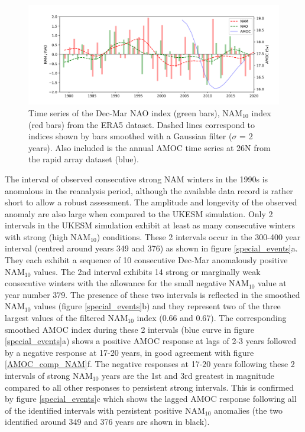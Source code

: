 \begin{figure}[h!]
\begin{center}
\noindent\includegraphics[width = 0.9\linewidth]{Figures/Figures-surface/ERA5_series_allf.png} \caption[Time series of NAO, NAM$_{10}$ and AMOC from the ERA5 and  RAPID]{Time series of the Dec-Mar NAO index (green bars), NAM$_{10}$ index (red bars) from the ERA5 dataset. Dashed lines correspond to indices shown by bars smoothed with a Gaussian filter ($\sigma$ = 2 years). Also included is the annual AMOC time series at 26N from the rapid array dataset (blue).}
\label{ERA5_series}
\end{center}
\end{figure}

The interval of observed consecutive strong NAM winters in the 1990s is anomalous in the reanalysis period, although the available data record is rather short to allow a robust assessment. The amplitude and longevity of the observed anomaly are also large when compared to the UKESM simulation. Only 2 intervals in the UKESM simulation exhibit at least as many consecutive winters with strong (high NAM$_{10}$) conditions. These 2 intervals occur in the 300-400 year interval (centred around years 349 and 376) as shown in figure \ref{special_events}a. They each exhibit a sequence of 10 consecutive Dec-Mar anomalously positive NAM$_{10}$ values. The 2nd interval exhibits 14 strong or marginally weak consecutive winters with the allowance for the small negative NAM$_{10}$ value at year number 379. The presence of these two intervals is reflected in the smoothed NAM$_{10}$ values (figure \ref{special_events}b) and they represent two of the three largest values of the filtered NAM$_{10}$ index (0.66 and 0.67). The corresponding smoothed AMOC index during these 2 intervals (blue curve in figure \ref{special_events}a) shows a positive AMOC response at lags of 2-3 years followed by a negative response at 17-20 years, in good agreement with figure \ref{AMOC_comp_NAM}f. The negative responses at 17-20 years following these 2 intervals of strong NAM$_{10}$ years are the 1st and 3rd greatest in magnitude compared to all other responses to persistent strong intervals. This is confirmed by figure \ref{special_events}c which shows the lagged AMOC response following all of the identified intervals with persistent positive NAM$_{10}$ anomalies (the two identified around 349 and 376 years are shown in black). 

